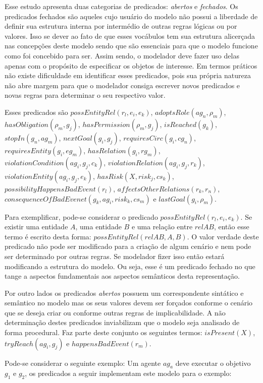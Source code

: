 Esse estudo apresenta duas categorias de predicados: \textit{abertos} e \textit{fechados}. Os predicados fechados são aqueles cujo usuário do modelo não possui a liberdade de definir sua estrutura interna por intermédio de outras regras lógicas ou por valores. Isso se dever ao fato de que esses vocábulos tem sua estrutura alicerçada nas concepções deste modelo sendo que são essenciais para que o modelo funcione como foi concebido para ser. Assim sendo, o modelador deve fazer uso delas apenas com o propósito de especificar os objetos de interesse. Em termos práticos não existe dificuldade em identificar esses predicados, pois sua própria natureza não abre margem para que o modelador consiga escrever novos predicados e novas regras para determinar o seu respectivo valor. 

Esses predicados são $possEntityRel(r_l,e_i,e_k)$, $adoptsRole(ag_n,\rho_m)$, $hasObligation(\rho_m,g_j)$,
$hasPermission(\rho_m, g_j)$, $isReached(g_k)$, $stopIn(g_n, ag_m)$, $nextGoal(g_i,g_j)$, $requiresCirc(g_i,cg_n)$,
$requiresEntity(g_i,eg_m)$, $hasRelation(g_i,rg_m)$, $violationCondition(ag_i,g_j,c_k) $, $ violationRelation(ag_i,g_j,r_k) $,
$ violationEntity(ag_i,g_j,e_k) $,  $ hasRisk(X, risk_j, cs_k) $, $possibilityHappensBadEvent(r_l)$, 
$affectsOtherRelations(r_k,r_n)$, $consequenceOfBadEvenet(g_k, ag_i,risk_k,cs_m)$  e $lastGoal(g_i,\rho_m)$. 


Para exemplificar, pode-se considerar o predicado $possEntityRel(r_l,e_i,e_k)$. Se existir uma entidade $A$, uma entidade $B$ e uma relação entre $relAB$, então esse termo é escrito desta forma: $possEntityRel(relAB,A,B)$. O valor verdade deste predicado não pode ser modificado para a criação de algum cenário e nem pode ser determinado por outras regras. Se modelador fizer isso então estará modificando a estrutura do modelo. Ou seja, esse é um predicado fechado no que tange a aspectos fundamentais aos aspectos semânticos desta representação. 

Por outro lados os predicados \textit{abertos} possuem um correspondente sintático e semântico no modelo mas os seus valores devem ser forçados conforme o cenário que se deseja criar ou conforme outras regras de implicabilidade. A não determinação destes predicados inviabilizam que o modelo seja analisado de forma procedural. Faz parte deste conjunto os seguintes termos: $isPresent(X)$,$tryReach(ag_i,g_j)$ e $happensBadEvent(r_m)$.

Pode-se considerar o seguinte exemplo: Um agente $ag_a$ deve executar o objetivo $g_1$ e $g_2$, os predicados a seguir implementam este modelo para o exemplo:

